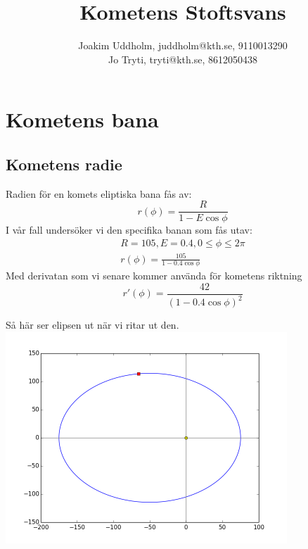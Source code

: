 \documentclass[11pt,twoside]{article}
\title{Kometens Stoftsvans}
\author{Joakim Uddholm, juddholm@kth.se, 9110013290 \\
		Jo Tryti, tryti@kth.se, 8612050438}
\date{}
\begin{document}
\maketitle
\newpage


\section{Kometens bana}

\subsection{Kometens radie}
Radien för en komets eliptiska bana fås av:
\begin{equation}
    r(\phi)=\frac{R}{1-E\cos\phi}
\end{equation}
I vår fall undersöker vi den specifika banan som fås utav:
\begin{equation}
	\begin{split}
     R = 105, E = 0.4, 0 \leq \phi \leq 2\pi \\
     r(\phi)=\frac{105}{1-0.4\cos\phi}
     \end{split}
\end{equation}
Med derivatan som vi senare kommer använda för kometens riktning
\begin{equation}
    r'(\phi)=\frac{42}{(1-0.4\cos\phi)^2}
\end{equation}

Så här ser elipsen ut när vi ritar ut den.
\includegraphics[width=300pt]{imgs/elipse.png}
\end{document}
